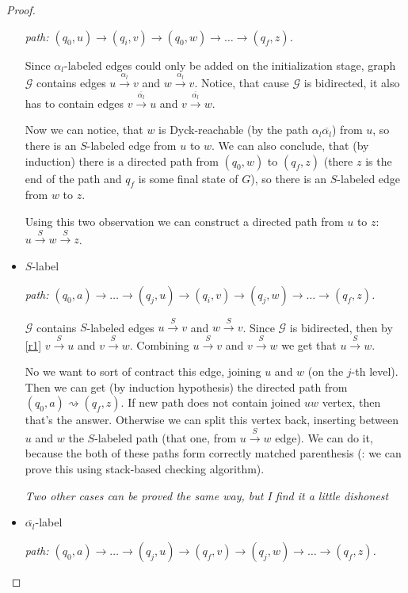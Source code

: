 \begin{proof}
\begin{itemize}
        \textit{path: $(q_0, u) \rightarrow (q_i, v) \rightarrow (q_0, w) \rightarrow \dots \rightarrow (q_f, z)$.}

        Since $\alpha_l$-labeled edges could only be added on the initialization stage, 
        graph $\mathcal{G}$ contains edges $u \xrightarrow{\alpha_l} v$ and $w \xrightarrow{\alpha_l} v$. Notice, that cause $\mathcal{G}$ is bidirected, it also has to contain edges $v \xrightarrow{\overline{\alpha_l}} u$ and $v \xrightarrow{\overline{\alpha_l}} w$.

        Now we can notice, that $w$ is Dyck-reachable (by the path $\alpha_l \overline{\alpha_l}$) from $u$, so there is an $S$-labeled edge from $u$ to $w$. We can also conclude, that (by induction) there is a directed path from $(q_0, w)$ to $(q_f, z)$ (there $z$ is the end of the path and $q_f$ is some final state of $G$), so there is an $S$-labeled edge from $w$ to $z$. 

        Using this two observation we can construct a directed path from $u$ to $z$: $u \xrightarrow{S} w \xrightarrow{S} z$. 
    \item $S$-label

        \textit{path: $(q_0, a) \rightarrow \dots \rightarrow (q_j, u) \rightarrow (q_i, v) \rightarrow (q_j, w) \rightarrow \dots \rightarrow (q_f, z)$.}

        $\mathcal{G}$ contains $S$-labeled edges $u \xrightarrow{S} v$ and $w \xrightarrow{S} v$. Since $\mathcal{G}$ is bidirected, then by \ref{r1} $v \xrightarrow{S} u$ and $v \xrightarrow{S} w$. Combining $u \xrightarrow{S} v$ and $v \xrightarrow{S} w$ we get that $u \xrightarrow{S} w$. 

        No we want to sort of contract this edge, joining $u$ and $w$ (on the $j$-th level). Then we can get (by induction hypothesis) the directed path from $(q_0, a) \rightsquigarrow (q_f, z)$. If new path does not contain joined $uw$ vertex, then that's the answer. Otherwise we can split this vertex back, inserting between $u$ and $w$ the $S$-labeled path (that one, from $u \xrightarrow{S} w$ edge). We can do it, because the both of these paths form correctly matched parenthesis ({\color{red}{TODO}}: we can prove this using stack-based checking algorithm).

        \textit{Two other cases can be proved the same way, but I find it a little dishonest}

    \item $\overline{\alpha_l}$-label

        \textit{path: $(q_0, a) \rightarrow \dots \rightarrow (q_j, u) \rightarrow (q_f, v) \rightarrow (q_j, w) \rightarrow \dots \rightarrow (q_f, z)$.}


\end{itemize}
\end{proof}
